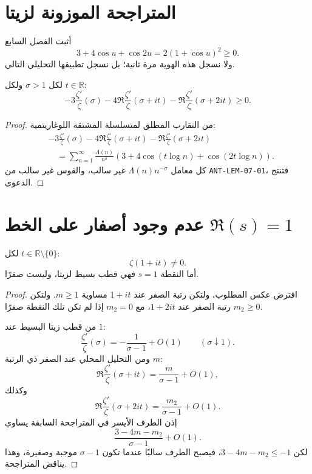 \section{المتراجحة الموزونة لزيتا}

أثبت الفصل السابع
\[
3+4\cos u+\cos2u=2(1+\cos u)^2\ge0.
\]
ولا نسجل هذه الهوية مرة ثانية؛ بل نسجل تطبيقها التحليلي التالي.

\begin{lemma}
\label{lem:zeta-weighted-log-derivative-inequality}
\provedhere
لكل \(\sigma>1\) ولكل \(t\in\mathbb R\):
\[
-3\frac{\zeta'}{\zeta}(\sigma)
-4\Re\frac{\zeta'}{\zeta}(\sigma+it)
-\Re\frac{\zeta'}{\zeta}(\sigma+2it)
\ge0.
\]
\end{lemma}

\begin{proof}
من التقارب المطلق لمتسلسلة المشتقة اللوغاريتمية:
\begin{align*}
&-3\frac{\zeta'}{\zeta}(\sigma)
-4\Re\frac{\zeta'}{\zeta}(\sigma+it)
-\Re\frac{\zeta'}{\zeta}(\sigma+2it)\\
&\quad=
\sum_{n=1}^{\infty}
\frac{\Lambda(n)}{n^\sigma}
\left(
3+4\cos(t\log n)+\cos(2t\log n)
\right).
\end{align*}
كل معامل \(\Lambda(n)n^{-\sigma}\) غير سالب، والقوس غير سالب من
\textenglish{\texttt{ANT-LEM-07-01}}، فتنتج الدعوى.
\end{proof}

\section{عدم وجود أصفار على الخط \(\Re(s)=1\)}

\begin{theorem}
\label{thm:zeta-nonvanishing-on-one-line}
\provedhere
لكل \(t\in\mathbb R\setminus\{0\}\):
\[
\zeta(1+it)\ne0.
\]
أما النقطة \(s=1\) فهي قطب بسيط لزيتا، وليست صفرًا.
\end{theorem}

\begin{proof}
افترض عكس المطلوب، ولتكن رتبة الصفر عند \(1+it\) مساوية \(m\ge1\).
ولتكن \(m_2\ge0\) رتبة الصفر عند \(1+2it\)، مع \(m_2=0\) إذا لم تكن
تلك النقطة صفرًا.

من قطب زيتا البسيط عند \(1\):
\[
\frac{\zeta'}{\zeta}(\sigma)
=-\frac1{\sigma-1}+O(1)
\qquad(\sigma\downarrow1).
\]
ومن التحليل المحلي عند الصفر ذي الرتبة \(m\):
\[
\Re\frac{\zeta'}{\zeta}(\sigma+it)
=
\frac{m}{\sigma-1}+O(1),
\]
وكذلك
\[
\Re\frac{\zeta'}{\zeta}(\sigma+2it)
=
\frac{m_2}{\sigma-1}+O(1).
\]
إذن الطرف الأيسر في المتراجحة السابقة يساوي
\[
\frac{3-4m-m_2}{\sigma-1}+O(1).
\]
لكن \(3-4m-m_2\le-1\)، فيصبح الطرف سالبًا عندما تكون
\(\sigma-1\) موجبة وصغيرة، وهذا يناقض المتراجحة.
\end{proof}

